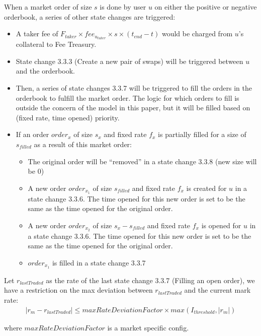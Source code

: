 \documentclass{article}%
\begin{document}
When a market order of size $s$ is done by user $u$ on either the positive or negative orderbook, a series of other state changes are triggered:
\begin{itemize}
    \item A taker fee of $F_{taker}\times fee_{u_{taker}} \times s\times (t_{end}-t)$ would be charged from $u$'s collateral to Fee Treasury.
    \item State change 3.3.3 (Create a new pair of swaps) will be triggered between $u$ and the orderbook.
    \item Then, a series of state changes 3.3.7 will be triggered to fill the orders in the orderbook to fulfill the market order. The logic for which orders to fill is outside the concern of the model in this paper, but it will be filled based on (fixed rate, time opened) priority.
    \item If an order $order_x$ of size $s_x$ and fixed rate $f_x$ is partially filled for a size of $s_{filled}$ as a result of this market order:
    \begin{itemize}
        \item The original order will be ``removed'' in a state change 3.3.8 (new size will be 0)
        \item A new order $order_{x_1}$ of size $s_{filled}$ and fixed rate $f_x$ is created for $u$ in a state change 3.3.6. The time opened for this new order is set to be the same as the time opened for the original order.
        \item A new order $order_{x_2}$ of size $s_x - s_{filled}$ and fixed rate $f_x$ is opened for $u$ in a state change 3.3.6. The time opened for this new order is set to be the same as the time opened for the original order.
        \item $order_{x_1}$ is filled in a state change 3.3.7
    \end{itemize}
\end{itemize}

Let $r_{lastTraded}$ as the rate of the last state change 3.3.7 (Filling an open order), we have a restriction on the max deviation between $r_{lastTraded}$ and the current mark rate:
\begin{align*}
    |r_m - r_{lastTraded}| \leq maxRateDeviationFactor \times max(I_{threshold}, |r_m|)
\end{align*}

where $maxRateDeviationFactor$ is a market specific config.
\end{document}
